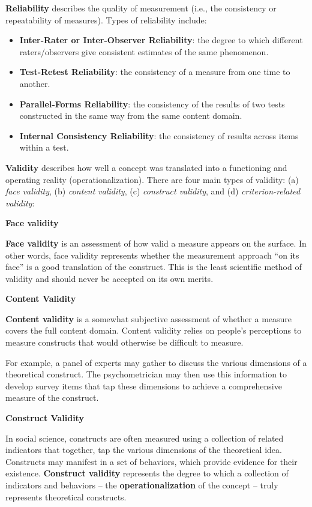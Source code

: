 \documentclass[]{book}
\providecommand{\tightlist}{%
  \setlength{\itemsep}{0pt}\setlength{\parskip}{0pt}}
\begin{document}
\textbf{Reliability} describes the quality of measurement (i.e., the consistency or repeatability of measures). Types of reliability include:

\begin{itemize}
\tightlist
\item
  \textbf{Inter-Rater or Inter-Observer Reliability}: the degree to which different raters/observers give consistent estimates of the same phenomenon.
\item
  \textbf{Test-Retest Reliability}: the consistency of a measure from one time to another.
\item
  \textbf{Parallel-Forms Reliability}: the consistency of the results of two tests constructed in the same way from the same content domain.
\item
  \textbf{Internal Consistency Reliability}: the consistency of results across items within a test.
\end{itemize}

\textbf{Validity} describes how well a concept was translated into a functioning and operating reality (operationalization). There are four main types of validity: (a) \emph{face validity}, (b) \emph{content validity}, (c) \emph{construct validity}, and (d) \emph{criterion-related validity}:

\textbf{Face validity}

\textbf{Face validity} is an assessment of how valid a measure appears on the surface. In other words, face validity represents whether the measurement approach ``on its face'' is a good translation of the construct. This is the least scientific method of validity and should never be accepted on its own merits.

\textbf{Content Validity}

\textbf{Content validity} is a somewhat subjective assessment of whether a measure covers the full content domain. Content validity relies on people's perceptions to measure constructs that would otherwise be difficult to measure.

For example, a panel of experts may gather to discuss the various dimensions of a theoretical construct. The psychometrician may then use this information to develop survey items that tap these dimensions to achieve a comprehensive measure of the construct.

\textbf{Construct Validity}

In social science, constructs are often measured using a collection of related indicators that together, tap the various dimensions of the theoretical idea. Constructs may manifest in a set of behaviors, which provide evidence for their existence. \textbf{Construct validity} represents the degree to which a collection of indicators and behaviors -- the \textbf{operationalization} of the concept -- truly represents theoretical constructs.
\end{document}
